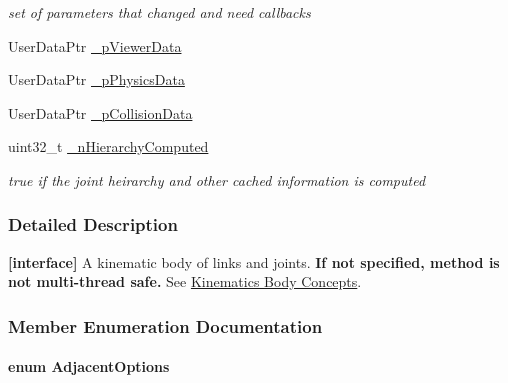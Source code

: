 \begin{DoxyCompactItemize}
\begin{DoxyCompactList}\small\item\em set of parameters that changed and need callbacks \item\end{DoxyCompactList}\item 
UserDataPtr \hyperlink{classOpenRAVE_1_1KinBody_aff45addfa1926549479a9786a92d6246}{\_\-pViewerData}
\item 
UserDataPtr \hyperlink{classOpenRAVE_1_1KinBody_a3f8a2e40760cf2ee75f604c0f18b27ec}{\_\-pPhysicsData}
\item 
UserDataPtr \hyperlink{classOpenRAVE_1_1KinBody_a0a17ef574c66277ef313e5e56d6b9bbc}{\_\-pCollisionData}
\item 
\hypertarget{classOpenRAVE_1_1KinBody_aca4c77d19ed947e26826284b9c8b5d56}{
uint32\_\-t \hyperlink{classOpenRAVE_1_1KinBody_aca4c77d19ed947e26826284b9c8b5d56}{\_\-nHierarchyComputed}}
\label{classOpenRAVE_1_1KinBody_aca4c77d19ed947e26826284b9c8b5d56}

\begin{DoxyCompactList}\small\item\em true if the joint heirarchy and other cached information is computed \item\end{DoxyCompactList}\end{DoxyCompactItemize}


\subsubsection{Detailed Description}
{\bfseries \mbox{[}interface\mbox{]}} A kinematic body of links and joints. {\bfseries If not specified, method is not multi-\/thread safe.} See \hyperlink{arch__kinbody}{Kinematics Body Concepts}. 

\subsubsection{Member Enumeration Documentation}
\hypertarget{classOpenRAVE_1_1KinBody_ace43b2d7d920eeb2eb69299a4784b040}{
\paragraph[{AdjacentOptions}]{\setlength{\rightskip}{0pt plus 5cm}enum {\bf AdjacentOptions}}\hfill}
\label{classOpenRAVE_1_1KinBody_ace43b2d7d920eeb2eb69299a4784b040}


